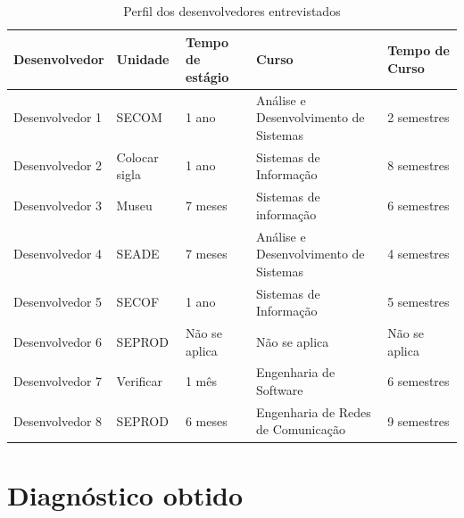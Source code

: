 \begin{table}[h]
	\centering
	\begin{tabular}{|m{2.88cm} | m{2.8cm} | m{2.2cm}| m{2.8cm} | m{2.2cm}|}
		\hline
		\textbf{Desenvolvedor} & \textbf{Unidade} & \textbf{Tempo de estágio} & 
		\textbf{Curso} & \textbf{Tempo de Curso} \\ \hline
		Desenvolvedor 1 & SECOM & 1 ano & Análise e Desenvolvimento de Sistemas & 2 semestres \\
		\hline
		Desenvolvedor 2 & Colocar sigla & 1 ano & Sistemas de Informação & 8 semestres \\
		\hline
		Desenvolvedor 3 & Museu & 7 meses & Sistemas de informação & 6 semestres \\
		\hline
		Desenvolvedor 4 & SEADE & 7 meses & Análise e Desenvolvimento de Sistemas & 4 semestres \\
		\hline
		Desenvolvedor 5 & SECOF & 1 ano & Sistemas de Informação & 5 semestres \\
		\hline
		Desenvolvedor 6 & SEPROD & Não se aplica & Não se aplica & Não se aplica \\
		\hline
		Desenvolvedor 7 & Verificar & 1 mês & Engenharia de Software & 6 semestres \\
		\hline
		Desenvolvedor 8 & SEPROD & 6 meses & Engenharia de Redes de Comunicação & 9 semestres \\
		\hline
	\end{tabular}

	\caption{Perfil dos desenvolvedores entrevistados}
	\label{tab01}
\end{table}


\section{Diagnóstico obtido}

